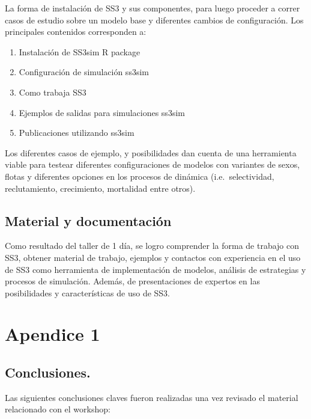 \documentclass[]{article}
\begin{document}
La forma de instalación de SS3 y sus componentes, para luego proceder a
correr casos de estudio sobre un modelo base y diferentes cambios de
configuración. Los principales contenidos corresponden a:

\begin{enumerate}
\def\labelenumi{\alph{enumi})}
\item
  Instalación de SS3sim R package
\item
  Configuración de simulación ss3sim
\item
  Como trabaja SS3
\item
  Ejemplos de salidas para simulaciones ss3sim
\item
  Publicaciones utilizando ss3sim
\end{enumerate}

Los diferentes casos de ejemplo, y posibilidades dan cuenta de una
herramienta viable para testear diferentes configuraciones de modelos
con variantes de sexos, flotas y diferentes opciones en los procesos de
dinámica (i.e.~selectividad, reclutamiento, crecimiento, mortalidad
entre otros).

\subsection{Material y documentación}\label{material-y-documentacion}

Como resultado del taller de 1 día, se logro comprender la forma de
trabajo con SS3, obtener material de trabajo, ejemplos y contactos con
experiencia en el uso de SS3 como herramienta de implementación de
modelos, análisis de estrategias y procesos de simulación. Además, de
presentaciones de expertos en las posibilidades y características de uso
de SS3.

\section{Apendice 1}\label{apendice-1}

\subsection{Conclusiones.}\label{conclusiones.}

Las siguientes conclusiones claves fueron realizadas una vez revisado el
material relacionado con el workshop:
\end{document}

